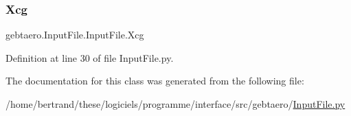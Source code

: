 \mbox{\label{classgebtaero_1_1_input_file_1_1_input_file_a3e49397db5d15285d57c3df5311bf2f8}} 
\subsubsection{\texorpdfstring{Xcg}{Xcg}}
{\footnotesize\ttfamily gebtaero.\+Input\+File.\+Input\+File.\+Xcg}



Definition at line 30 of file Input\+File.\+py.



The documentation for this class was generated from the following file\+:\begin{DoxyCompactItemize}
\item 
/home/bertrand/these/logiciels/programme/interface/src/gebtaero/\hyperlink{_input_file_8py}{Input\+File.\+py}\end{DoxyCompactItemize}
